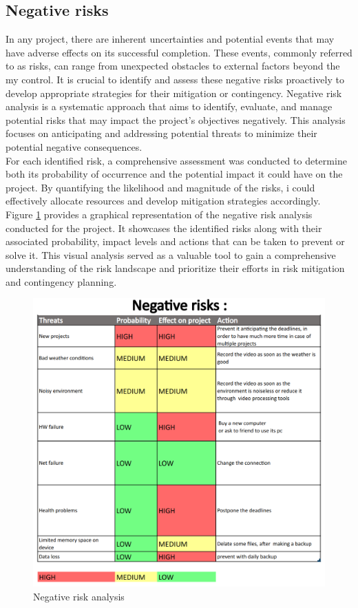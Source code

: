 \documentclass[eng]{class}
\begin{document}
\subsection{Negative risks}
In any project, there are inherent uncertainties and potential events that may have adverse effects on its successful completion.
These events, commonly referred to as risks, can range from unexpected obstacles to external factors beyond the my control.
It is crucial to identify and assess these negative risks proactively to develop appropriate strategies for their mitigation or contingency.
Negative risk analysis is a systematic approach that aims to identify, evaluate, and manage potential risks that may impact the project's objectives negatively.
This analysis focuses on anticipating and addressing potential threats to minimize their potential negative consequences.\\
For each identified risk, a comprehensive assessment was conducted to determine both its probability of occurrence and the potential impact it could have on the project.
By quantifying the likelihood and magnitude of the risks, i could effectively allocate resources and develop mitigation strategies accordingly.\\
Figure \ref{fig-4} provides a graphical representation of the negative risk analysis conducted for the project.
It showcases the identified risks along with their associated probability, impact levels and actions that can be taken to prevent or solve it. This visual analysis served as
a valuable tool to gain a comprehensive understanding of the risk landscape and prioritize their efforts
in risk mitigation and contingency planning.
\begin{figure}[h!]
  \centering
  \includegraphics[width=\columnwidth]{images/negative risks.png}
  \caption{Negative risk analysis}
  \label{fig-4}
\end{figure}
\end{document}
